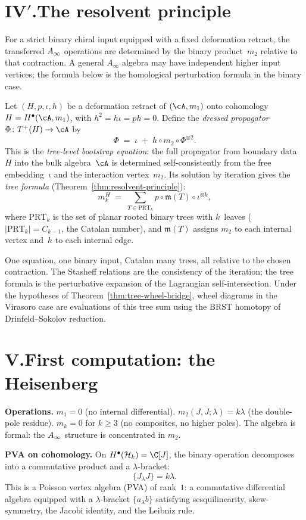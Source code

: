 \section*{IV$'$.\quad The resolvent principle}

For a strict binary chiral input equipped with a fixed deformation
retract, the transferred $A_\infty$ operations are determined by the
binary product~$m_2$ relative to that contraction.  A general
$A_\infty$ algebra may have independent higher input vertices; the
formula below is the homological perturbation formula in the binary
case.

Let $(H, p, \iota, h)$ be a deformation retract of $(\cA, m_1)$
onto cohomology $H = H^\bullet(\cA, m_1)$, with $h^2 = h\iota =
ph = 0$. Define the \emph{dressed propagator}
$\Phi \colon T^+(H) \to \cA$ by
\[
\Phi \;=\; \iota \;+\; h \circ m_2 \circ \Phi^{\otimes 2}.
\]
This is the \emph{tree-level bootstrap equation}: the full
propagator from boundary data~$H$ into the bulk algebra~$\cA$ is
determined self-consistently from the free embedding~$\iota$ and
the interaction vertex~$m_2$. Its solution by iteration gives the
\emph{tree formula}
(Theorem~\ref{thm:resolvent-principle}):
\[
m_k^H
\;=\;
\sum_{T \in \mathrm{PRT}_k}
p \circ \mathfrak{m}(T) \circ \iota^{\otimes k},
\]
where $\mathrm{PRT}_k$ is the set of planar rooted binary trees
with $k$~leaves ($|\mathrm{PRT}_k| = C_{k-1}$, the Catalan
number), and $\mathfrak{m}(T)$ assigns $m_2$ to each internal
vertex and~$h$ to each internal edge.

One equation, one binary input, Catalan many trees, all relative to
the chosen contraction. The Stasheff relations are the consistency of
the iteration; the tree formula is the perturbative expansion of the
Lagrangian self-intersection. Under the hypotheses of
Theorem~\ref{thm:tree-wheel-bridge}, wheel diagrams in the Virasoro
case are evaluations of this tree sum using the BRST homotopy of
Drinfeld--Sokolov reduction.


\section*{V.\quad First computation: the Heisenberg}

\noindent\textbf{Operations.}\enspace
$m_1 = 0$ (no internal differential).
$m_2(J,J;\lambda) = k\lambda$ (the double-pole residue).
$m_k = 0$ for $k \ge 3$ (no composites, no higher poles).
The algebra is formal: the $A_\infty$ structure is concentrated in
$m_2$.

\smallskip
\noindent\textbf{PVA on cohomology.}\enspace
On $H^\bullet(\cH_k) = \C[J]$, the binary operation decomposes
into a commutative product and a $\lambda$-bracket:
\[
\{J_\lambda J\} = k\lambda.
\]
This is a Poisson vertex algebra (PVA) of rank~$1$: a commutative differential algebra equipped with a $\lambda$-bracket $\{a_\lambda b\}$ satisfying sesquilinearity, skew-symmetry, the Jacobi identity, and the Leibniz rule.

